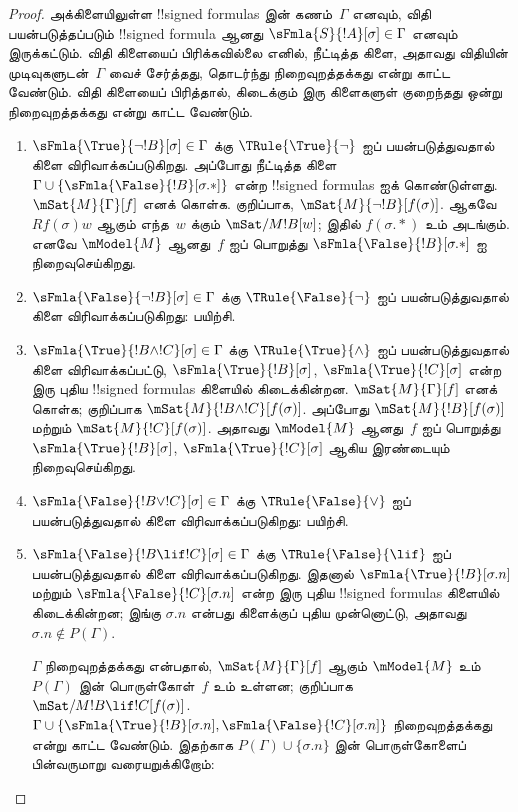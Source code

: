 \documentclass[../../../include/open-logic-section]{subfiles}
\begin{document}
\begin{proof}
அக்கிளையிலுள்ள !!{signed formula}s இன் கணம்~$\Gamma$ எனவும், விதி
பயன்படுத்தப்படும் !!{signed formula} ஆனது
$\sFmla{S}{!A}[\sigma] \in \Gamma$ எனவும் இருக்கட்டும். விதி கிளையைப்
பிரிக்கவில்லை எனில், நீட்டித்த கிளை, அதாவது விதியின் முடிவுகளுடன்~$\Gamma$
வைச் சேர்த்தது, தொடர்ந்து நிறைவுறத்தக்கது என்று காட்ட வேண்டும். விதி
கிளையைப் பிரித்தால், கிடைக்கும் இரு கிளைகளுள் குறைந்தது ஒன்று
நிறைவுறத்தக்கது என்று காட்ட வேண்டும்.
\begin{enumerate}
\item $\sFmla{\True}{\lnot !B}[\sigma] \in \Gamma$ க்கு
  $\TRule{\True}{\lnot}$ ஐப் பயன்படுத்துவதால் கிளை விரிவாக்கப்படுகிறது.
  அப்போது நீட்டித்த கிளை~$\Gamma \cup
  \{\sFmla{\False}{!B}[\sigma.{*}]\}$ என்ற !!{signed formula}s ஐக்
  கொண்டுள்ளது. $\mSat{M}{\Gamma}[f]$ எனக் கொள்க. குறிப்பாக,
  $\mSat{M}{\lnot !B}[f(\sigma)]$. ஆகவே $Rf(\sigma)w$ ஆகும் எந்த~$w$
  க்கும் $\mSat/{M}{!B}[w]$; இதில் $f(\sigma.{*})$ உம் அடங்கும்.
  எனவே $\mModel{M}$ ஆனது~$f$ ஐப் பொறுத்து
  $\sFmla{\False}{!B}[\sigma.{*}]$ ஐ நிறைவுசெய்கிறது.
\item $\sFmla{\False}{\lnot !B}[\sigma] \in \Gamma$ க்கு
  $\TRule{\False}{\lnot}$ ஐப் பயன்படுத்துவதால் கிளை விரிவாக்கப்படுகிறது:
  பயிற்சி.
\item $\sFmla{\True}{!B \land !C}[\sigma] \in \Gamma$ க்கு
  $\TRule{\True}{\land}$ ஐப் பயன்படுத்துவதால் கிளை விரிவாக்கப்பட்டு,
  $\sFmla{\True}{!B}[\sigma]$, $\sFmla{\True}{!C}[\sigma]$ என்ற இரு
  புதிய !!{signed formula}s கிளையில் கிடைக்கின்றன.
  $\mSat{M}{\Gamma}[f]$ எனக் கொள்க; குறிப்பாக
  $\mSat{M}{!B \land !C}[f(\sigma)]$. அப்போது
  $\mSat{M}{!B}[f(\sigma)]$ மற்றும் $\mSat{M}{!C}[f(\sigma)]$.
  அதாவது $\mModel{M}$ ஆனது~$f$ ஐப் பொறுத்து
  $\sFmla{\True}{!B}[\sigma]$, $\sFmla{\True}{!C}[\sigma]$ ஆகிய
  இரண்டையும் நிறைவுசெய்கிறது.
\item $\sFmla{\False}{!B \lor !C}[\sigma] \in \Gamma$ க்கு
  $\TRule{\False}{\lor}$ ஐப் பயன்படுத்துவதால் கிளை விரிவாக்கப்படுகிறது:
  பயிற்சி.
\item $\sFmla{\False}{!B \lif !C}[\sigma] \in \Gamma$ க்கு
  $\TRule{\False}{\lif}$ ஐப் பயன்படுத்துவதால் கிளை விரிவாக்கப்படுகிறது.
  இதனால் $\sFmla{\True}{!B}[\sigma.n]$ மற்றும்
  $\sFmla{\False}{!C}[\sigma.n]$ என்ற இரு புதிய !!{signed formula}s
  கிளையில் கிடைக்கின்றன; இங்கு $\sigma.n$ என்பது கிளைக்குப் புதிய முன்னொட்டு,
  அதாவது $\sigma.n \notin P(\Gamma)$.

  $\Gamma$ நிறைவுறத்தக்கது என்பதால், $\mSat{M}{\Gamma}[f]$ ஆகும்
  $\mModel{M}$ உம் $P(\Gamma)$ இன் பொருள்கோள்~$f$ உம் உள்ளன; குறிப்பாக
  $\mSat/{M}{!B \lif !C}[f(\sigma)]$. $\Gamma \cup
  \{\sFmla{\True}{!B}[\sigma.n], \sFmla{\False}{!C}[\sigma.n]\}$
  நிறைவுறத்தக்கது என்று காட்ட வேண்டும். இதற்காக $P(\Gamma) \cup
  \{\sigma.n\}$ இன் பொருள்கோளைப் பின்வருமாறு வரையறுக்கிறோம்:


\end{enumerate}
\end{proof}
\end{document}
